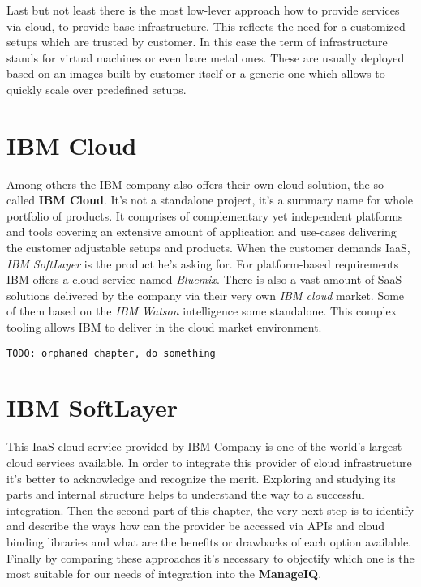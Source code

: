 Last but not least there is the most low-lever approach how to provide services via cloud, to provide base infrastructure. This reflects the need for a customized setups which are trusted by customer. In this case the term of infrastructure stands for virtual machines or even bare metal ones. These are usually deployed based on an images built by customer itself or a generic one which allows to quickly scale over predefined setups.

\chapter{IBM Cloud}
\label{chap:IBM Cloud}

Among others the IBM company also offers their own cloud solution, the so called \textbf{IBM Cloud}. It's not a standalone project, it's a summary name for whole portfolio of products. It comprises of complementary yet independent platforms and tools covering an extensive amount of application and use-cases delivering the customer adjustable setups and products. When the customer demands IaaS, \emph{IBM SoftLayer} is the product he's asking for. For platform-based requirements IBM offers a cloud service named \emph{Bluemix}. There is also a vast amount of SaaS solutions delivered by the company via their very own \emph{IBM cloud} market. Some of them based on the \emph{IBM Watson} intelligence some standalone. This complex tooling allows IBM to deliver in the cloud market environment.

\noindent\texttt{\color{OliveGreen}TODO: orphaned chapter, do something}

\chapter{IBM SoftLayer}
\label{chap:IBM SoftLayer}

This IaaS cloud service provided by IBM Company is one of the world's largest cloud services available. In order to integrate this provider of cloud infrastructure it's better to acknowledge and recognize the merit. Exploring and studying its parts and internal structure helps to understand the way to a successful integration. Then the second part of this chapter, the very next step is to identify and describe the ways how can the provider be accessed via APIs and cloud binding libraries and what are the benefits or drawbacks of each option available. Finally by comparing these approaches it's necessary to objectify which one is the most suitable for our needs of integration into the \textbf{ManageIQ}.

